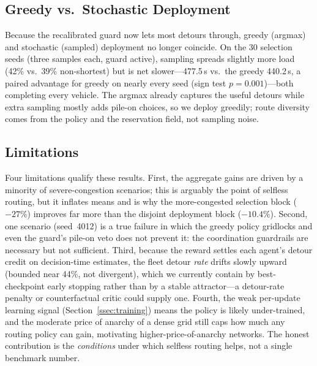 \subsection{Greedy vs.\ Stochastic Deployment}\label{ssec:greedy}
Because the recalibrated guard now lets most detours through, greedy (argmax) and
stochastic (sampled) deployment no longer coincide. On the 30 selection seeds (three samples
each, guard active), sampling spreads slightly more load (42\% vs.\ 39\% non-shortest) but
is net slower---477.5\,s vs.\ the greedy 440.2\,s, a paired advantage for greedy on nearly
every seed (sign test $p{=}0.001$)---both completing every vehicle. The argmax already
captures the useful detours while extra sampling mostly adds pile-on choices, so we deploy
greedily; route diversity comes from the policy and the reservation field, not sampling
noise.

\subsection{Limitations}\label{ssec:limits}
Four limitations qualify these results. First, the aggregate gains are driven by a minority
of severe-congestion scenarios; this is arguably the point of selfless routing, but it
inflates means and is why the more-congested selection block ($-27\%$) improves far more
than the disjoint deployment block ($-10.4\%$). Second, one scenario (seed~4012) is a true
failure in which the greedy policy gridlocks and even the guard's pile-on veto does not
prevent it: the coordination guardrails are necessary but not sufficient. Third, because
the reward settles each agent's detour credit on decision-time estimates, the fleet detour
\emph{rate} drifts slowly upward (bounded near 44\%, not divergent), which we currently
contain by best-checkpoint early stopping rather than by a stable attractor---a detour-rate
penalty or counterfactual critic could supply one. Fourth, the weak per-update learning
signal (Section~\ref{ssec:training}) means the policy is likely under-trained, and the
moderate price of anarchy of a dense grid still caps how much any routing policy can gain,
motivating higher-price-of-anarchy networks. The honest contribution is the \emph{conditions}
under which selfless routing helps, not a single benchmark number.
